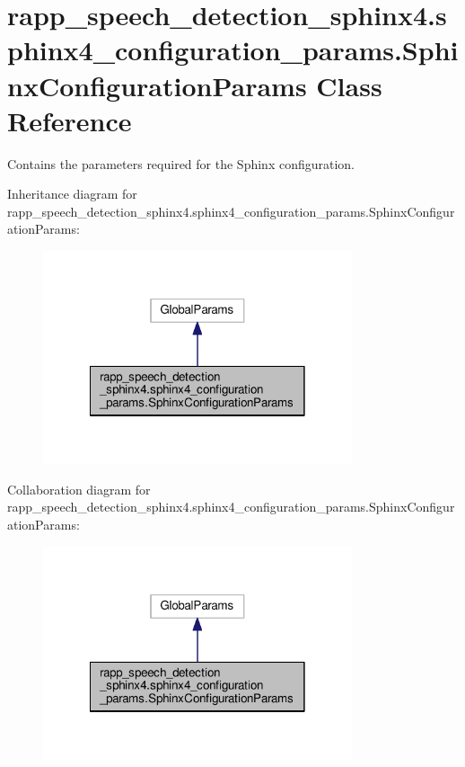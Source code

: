 \hypertarget{classrapp__speech__detection__sphinx4_1_1sphinx4__configuration__params_1_1SphinxConfigurationParams}{\section{rapp\-\_\-speech\-\_\-detection\-\_\-sphinx4.\-sphinx4\-\_\-configuration\-\_\-params.\-Sphinx\-Configuration\-Params Class Reference}
\label{classrapp__speech__detection__sphinx4_1_1sphinx4__configuration__params_1_1SphinxConfigurationParams}
}


Contains the parameters required for the Sphinx configuration.  




Inheritance diagram for rapp\-\_\-speech\-\_\-detection\-\_\-sphinx4.\-sphinx4\-\_\-configuration\-\_\-params.\-Sphinx\-Configuration\-Params\-:
\nopagebreak
\begin{figure}[H]
\begin{center}
\leavevmode
\includegraphics[width=258pt]{classrapp__speech__detection__sphinx4_1_1sphinx4__configuration__params_1_1SphinxConfigurationParams__inherit__graph}
\end{center}
\end{figure}


Collaboration diagram for rapp\-\_\-speech\-\_\-detection\-\_\-sphinx4.\-sphinx4\-\_\-configuration\-\_\-params.\-Sphinx\-Configuration\-Params\-:
\nopagebreak
\begin{figure}[H]
\begin{center}
\leavevmode
\includegraphics[width=258pt]{classrapp__speech__detection__sphinx4_1_1sphinx4__configuration__params_1_1SphinxConfigurationParams__coll__graph}
\end{center}
\end{figure}
